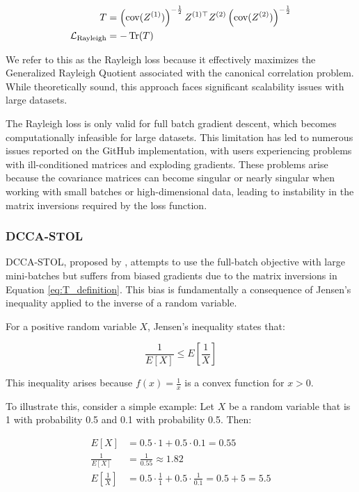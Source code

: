 \begin{align}\label{eq:T_definition}
    T          & = \left(\text{cov}(Z^{(1)})\right)^{-\frac{1}{2}} Z^{(1)\top} Z^{(2)} \left(\text{cov}(Z^{(2)})\right)^{-\frac{1}{2}} \\
    \mathcal{L}_\text{Rayleigh} & = -\operatorname{Tr}(T)
\end{align}

We refer to this as the Rayleigh loss because it effectively maximizes the Generalized Rayleigh Quotient associated with the canonical correlation problem. While theoretically sound, this approach faces significant scalability issues with large datasets.

The Rayleigh loss is only valid for full batch gradient descent, which becomes computationally infeasible for large datasets. This limitation has led to numerous issues reported on the GitHub implementation, with users experiencing problems with ill-conditioned matrices and exploding gradients. These problems arise because the covariance matrices can become singular or nearly singular when working with small batches or high-dimensional data, leading to instability in the matrix inversions required by the loss function.

\subsubsection{DCCA-STOL}
DCCA-STOL, proposed by \citet{wang2015unsupervised}, attempts to use the full-batch objective with large mini-batches but suffers from biased gradients due to the matrix inversions in Equation \eqref{eq:T_definition}. This bias is fundamentally a consequence of Jensen's inequality applied to the inverse of a random variable. 

For a positive random variable $X$, Jensen's inequality states that:

\begin{equation}
\frac{1}{E[X]} \leq E[\frac{1}{X}]
\end{equation}

This inequality arises because $f(x) = \frac{1}{x}$ is a convex function for $x > 0$. 

To illustrate this, consider a simple example: Let $X$ be a random variable that is 1 with probability 0.5 and 0.1 with probability 0.5. Then:

\begin{align}
    E[X] &= 0.5 \cdot 1 + 0.5 \cdot 0.1 = 0.55 \\
    \frac{1}{E[X]} &= \frac{1}{0.55} \approx 1.82 \\
    E[\frac{1}{X}] &= 0.5 \cdot \frac{1}{1} + 0.5 \cdot \frac{1}{0.1} = 0.5 + 5 = 5.5
\end{align}

